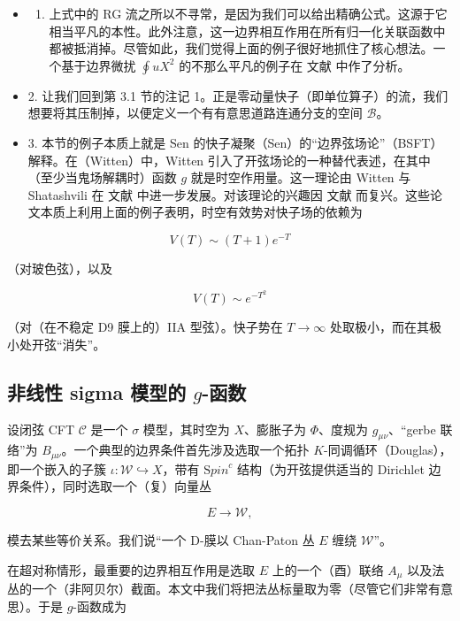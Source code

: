 \documentclass[11pt,a4paper]{ctexart}
\begin{document}
\begin{itemize}
\item
  \begin{enumerate}
  \def\labelenumi{\arabic{enumi}.}
  \tightlist
  \item
    上式中的 RG 流之所以不寻常，是因为我们可以给出精确公式。这源于它相当平凡的本性。此外注意，这一边界相互作用在所有归一化关联函数中都被抵消掉。尽管如此，我们觉得上面的例子很好地抓住了核心想法。一个基于边界微扰 \(\oint u X^2\) 的不那么平凡的例子在 文献 中作了分析。
  \end{enumerate}
\item
  2. 让我们回到第 3.1 节的注记 1。正是零动量快子（即单位算子）的流，我们想要将其压制掉，以便定义一个有有意思道路连通分支的空间 \({\mathcal B}\)。
\item
  3. 本节的例子本质上就是 Sen 的快子凝聚（Sen）的``边界弦场论''（BSFT）解释。在（Witten）中，Witten 引入了开弦场论的一种替代表述，在其中（至少当鬼场解耦时）函数 \(g\) 就是时空作用量。这一理论由 Witten 与 Shatashvili 在 文献 中进一步发展。对该理论的兴趣因 文献 而复兴。这些论文本质上利用上面的例子表明，时空有效势对快子场的依赖为
\end{itemize}

\[V(T) \sim (T+1) e^{-T}\]

（对玻色弦），以及

\[V(T) \sim e^{-T^2}\]

（对（在不稳定 D9 膜上的）IIA 型弦）。快子势在 \(T\to \infty\) 处取极小，而在其极小处开弦``消失''。

\subsection{\texorpdfstring{非线性 sigma 模型的 \(g\)-函数}{非线性 sigma 模型的 g-函数}}\label{ux975eux7ebfux6027-sigma-ux6a21ux578bux7684-g-ux51fdux6570}

设闭弦 CFT \({\mathcal C}\) 是一个 \(\sigma\) 模型，其时空为 \(X\)、膨胀子为 \(\Phi\)、度规为 \(g_{\mu\nu}\)、``gerbe 联络''为 \(B_{\mu\nu}\)。一个典型的边界条件首先涉及选取一个拓扑 \(K\)-同调循环（Douglas），即一个嵌入的子簇 \(\iota: {\mathcal W} \hookrightarrow X\)，带有 \({\mathrm Spin}^c\) 结构（为开弦提供适当的 Dirichlet 边界条件），同时选取一个（复）向量丛

\[E \to {\mathcal W},\]

模去某些等价关系。我们说``一个 D-膜以 Chan-Paton 丛 \(E\) 缠绕 \({\mathcal W}\)''。

在超对称情形，最重要的边界相互作用是选取 \(E\) 上的一个（酉）联络 \(A_{\mu}\) 以及法丛的一个（非阿贝尔）截面。本文中我们将把法丛标量取为零（尽管它们非常有意思）。于是 \(g\)-函数成为
\end{document}
